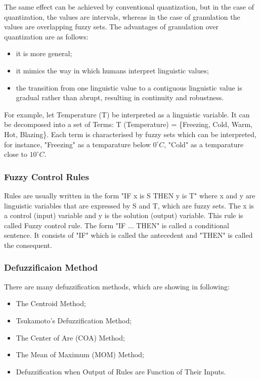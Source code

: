 \documentclass[graybox]{svmult}
\begin{document}
The same effect can be achieved by conventional
quantization, but in the case of quantization,
the values are intervals, whereas in the case
of granulation the values are overlapping
fuzzy sets.
The advantages of granulation over quantization
are as follows:
\begin{itemize}
	\item it is more general;	
	\item it mimics the way in which humans interpret linguistic
	values;	
	\item the transition from one linguistic value to a contiguous
	linguistic value is gradual rather than abrupt,
	resulting in continuity and robustness.
\end{itemize}
For example, let Temperature (T) be interpreted as a linguistic variable. It can be decomposed into a set of Terms: T (Temperature) = \{Freezing, Cold, Warm, Hot, Blazing\}. Each term is characterised by fuzzy sets which can be interpreted, for instance, "Freezing" as a temparature below  $0^{\circ}C$, "Cold" as a temparature close to  $10^{\circ}C$.
 

\subsubsection{Fuzzy Control Rules}
Rules are usually written in the form "IF x is S THEN y is T" where x and y are linguistic variables that are expressed by  S and T, which are fuzzy sets. The x is a control (input) variable and y is the solution (output) variable. This rule is called Fuzzy control rule. The form "IF ... THEN" is called  a conditional sentence. It consists of "IF" which is called the antecedent and "THEN" is called the consequent. 
 

\subsubsection{Defuzzificaion Method}
There are many defuzzification methods, which are showing in following:
\begin{itemize}
 \item The Centroid Method; 
 \item Tsukamoto's Defuzzification Method;
 \item The Center of Are (COA) Method;
 \item The Mean of Maximum (MOM) Method;
 \item Defuzzification when Output of Rules are Function of Their Inputs.
\end{itemize}
\end{document}
